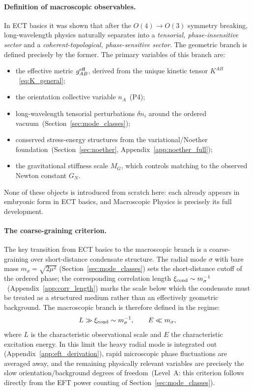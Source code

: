 \paragraph{Definition of macroscopic observables.}
In ECT basics it was shown that after the $O(4)\to O(3)$
symmetry breaking, long-wavelength physics naturally separates
into a \emph{tensorial, phase-insensitive sector} and a
\emph{coherent-topological, phase-sensitive sector}.
The geometric branch is defined precisely by the former.
The primary variables of this branch are:
\begin{itemize}
  \item the effective metric $g^{\rm eff}_{AB}$, derived from the
    unique kinetic tensor $K^{AB}$~\eqref{eq:K_general};
  \item the orientation collective variable $n_A$~(P4);
  \item long-wavelength tensorial perturbations $\delta n_i$
    around the ordered vacuum~(Section~\ref{sec:mode_classes});
  \item conserved stress-energy structures from the
    variational/Noether foundation~(Section~\ref{sec:noether},
    Appendix~\ref{app:noether_full});
  \item the gravitational stiffness scale $M_G$, which controls
    matching to the observed Newton constant $G_N$.
\end{itemize}
None of these objects is introduced from scratch here: each
already appears in embryonic form in ECT basics, and Macroscopic
Physics is precisely its full development.

\paragraph{The coarse-graining criterion.}
The key transition from ECT basics to the macroscopic branch is
a coarse-graining over short-distance condensate structure.
The radial mode $\sigma$ with bare mass $m_\sigma=\sqrt{2\mu^2}$
(Section~\ref{sec:mode_classes}) sets the short-distance cutoff
of the ordered phase; the corresponding correlation length
$\xi_{\rm cond}\sim m_\sigma^{-1}$~(Appendix~\ref{app:corr_length})
marks the scale below which the condensate must be treated as a
structured medium rather than an effectively geometric background.
The macroscopic branch is therefore defined in the regime:
\begin{equation}
  \label{eq:macro_regime}
  L \gg \xi_{\rm cond}\sim m_\sigma^{-1},
  \qquad
  E \ll m_\sigma,
\end{equation}
where $L$ is the characteristic observational scale and $E$
the characteristic excitation energy.
In this limit the heavy radial mode is integrated out
(Appendix~\ref{app:eft_derivation}), rapid microscopic
phase fluctuations are averaged away, and the remaining
physically relevant variables are precisely the slow
orientation/background degrees of freedom~(Level~A:
this criterion follows directly from the EFT power counting
of Section~\ref{sec:mode_classes}).

